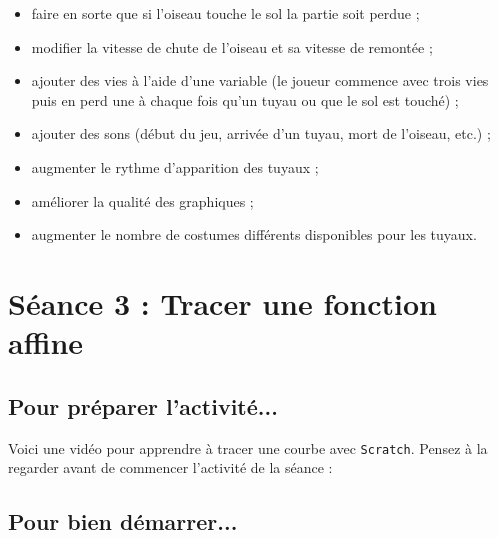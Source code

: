 \begin{itemize}
\item faire en sorte que si l'oiseau touche le sol la partie soit perdue ;
\item modifier la vitesse de chute de l'oiseau et sa vitesse de remontée ; 
\item ajouter des vies à l'aide d'une variable (le joueur commence avec trois vies puis en perd une à chaque fois qu'un tuyau ou que le sol est touché) ;
\item ajouter des sons (début du jeu, arrivée d'un tuyau, mort de l'oiseau, etc.) ;
\item augmenter le rythme d'apparition des tuyaux ; 
\item améliorer la qualité des graphiques ;
\item augmenter le nombre de costumes différents disponibles pour les tuyaux. 
\end{itemize}







%
%
%
%

\newpage

\section{Séance 3 : Tracer une fonction affine}\label{ficheScratch4e3}

\subsection{Pour préparer l'activité...}

\vspace{10pt}

Voici une vidéo pour apprendre à tracer une courbe avec \texttt{Scratch}. Pensez à la regarder avant de commencer l'activité de la séance :

\begin{center}
\end{center}

\vspace{12pt}

\subsection{Pour bien démarrer...}

